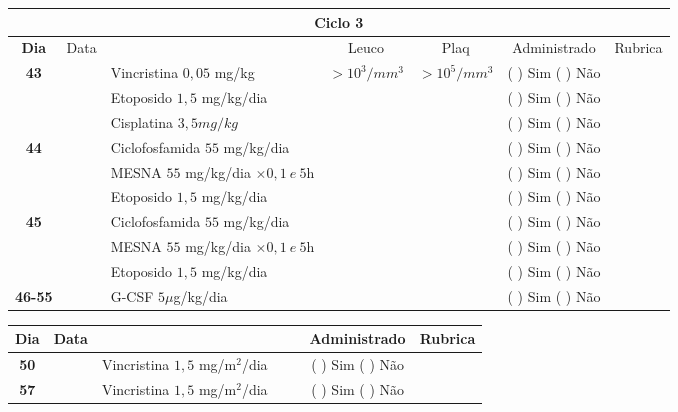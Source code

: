 \documentclass[11pt,a4paper,oldfontcommands]{memoir}
\begin{document}
\begin{center}
\begin{longtable}{p{1cm}c|p{4.64cm}|p{1.5cm}p{1.5cm}|c|c}
	\hline
	\multicolumn{7}{c}{Ciclo 3} \\
	\hline
	\multicolumn{1}{c|}{\multirow{1}{*}{\textbf{Dia}}}&{Data}&{}&\multicolumn{1}{c|}{Leuco}&\multicolumn{1}{c|}{Plaq}&{Administrado}&{Rubrica} \\
    \hline
    \multicolumn{1}{c|}{\multirow{3}{*}{\textbf{43}}}&&{Vincristina \(0,05\) mg/kg}&\multicolumn{1}{c|}{\(>10^3/mm^3\)}&\multicolumn{1}{c|}{\(>10^5/mm^3\)}&{(  ) Sim (  ) Não}&\\
    \cline{4-5}
    \multicolumn{1}{c|}{}&&{Etoposido \(1,5\) mg/kg/dia}&\multicolumn{1}{c|}{}&&{(  ) Sim (  ) Não}&\\
    \cline{4-5}
    \multicolumn{1}{c|}{}&\multirow{1}{*}{}&{Cisplatina \(3,5mg/kg\)}&&&{(  ) Sim (  ) Não}&\\
    \hline
    \multicolumn{1}{c|}{\multirow{3}{*}{\textbf{44}}}&&{Ciclofosfamida \(55\) mg/kg/dia}&{}&&{(  ) Sim (  ) Não}&\\
    \multicolumn{1}{c|}{}&&{MESNA \(55\) mg/kg/dia \(\times 0,1 \:e\: 5\)h}&&&{(  ) Sim (  ) Não}&\\
    \multicolumn{1}{c|}{}&&{Etoposido \(1,5\) mg/kg/dia}&&&{(  ) Sim (  ) Não}&\\
    \hline
    \multicolumn{1}{c|}{\multirow{3}{*}{\textbf{45}}}&&{Ciclofosfamida \(55\) mg/kg/dia}&{}&&{(  ) Sim (  ) Não}&\\
    \multicolumn{1}{c|}{}&&{MESNA \(55\) mg/kg/dia \(\times 0,1 \:e\: 5\)h}&&&{(  ) Sim (  ) Não}&\\
    \multicolumn{1}{c|}{}&\multirow{1}{*}{}&{Etoposido \(1,5\) mg/kg/dia}&{}&&{(  ) Sim (  ) Não}&\\
    \hline
    \multicolumn{1}{c|}{\textbf{46-55}}&&{G-CSF \(5 \mu\)g/kg/dia }&&&{(  ) Sim (  ) Não}&\\
    \hline
\end{longtable}
\clearpage
\begin{longtable}{p{1cm}c|p{4cm}|p{2cm}p{2cm}|c|c}
	\hline
	\multicolumn{1}{c|}{\multirow{1}{*}{\textbf{Dia}}}&{Data}&{}&{}&&{Administrado}&{Rubrica} \\
    \hline
    \multicolumn{1}{c|}{\textbf{50}}&&{Vincristina \(1,5\) mg/m\(^2\)/dia}&\multicolumn{1}{c}{}&&{(  ) Sim (  ) Não}&\\
    \hline
    \multicolumn{1}{c|}{\textbf{57}}&&{Vincristina \(1,5\) mg/m\(^2\)/dia}&\multicolumn{1}{c}{}&&{(  ) Sim (  ) Não}&\\
    \hline
\end{longtable}


\end{center}
\end{document}
